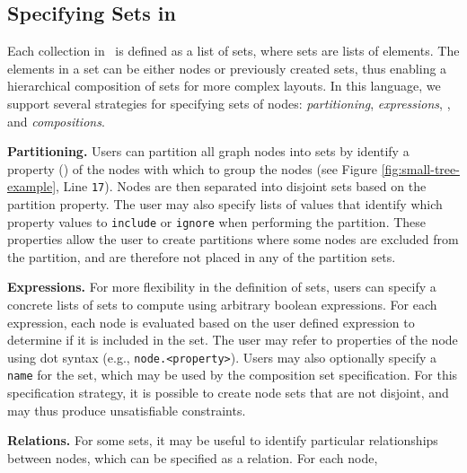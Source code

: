 
\subsection{Specifying Sets in \projectname}
Each collection in \projectname\ is defined as a list of sets, where sets
are lists of elements. The elements in a set can be either nodes or
previously created sets, thus enabling a hierarchical composition of sets
for more complex layouts. In this language, we support several strategies
for specifying sets of nodes: \emph{partitioning}, \emph{expressions},
, and \emph{compositions}.

\textbf{Partitioning.} Users can partition all graph nodes into sets by
identify a property () of the nodes
with which to group the nodes (see Figure \ref{fig:small-tree-example},
Line \texttt{17}). Nodes are then separated into disjoint sets based on the
partition property. The user may also specify lists of values that identify
which property values to \texttt{include} or \texttt{ignore} when
performing the partition. These properties allow the user to create
partitions where some nodes are excluded from the partition, and are
therefore not placed in any of the partition sets.

\textbf{Expressions.} For more flexibility in the definition of sets, users
can specify a concrete lists of sets to compute using arbitrary boolean
expressions. For each expression, each node is evaluated based on the user
defined expression to determine if it is included in the set. The user may
refer to properties of the node using dot syntax (e.g.,
\texttt{node.<property>}). Users may also optionally specify a
\texttt{name} for the set, which may be used by the composition set
specification. For this specification strategy, it is possible to create
node sets that are not disjoint, and may thus produce unsatisfiable
constraints. 

\textbf{Relations.} For some sets, it may be useful to identify particular
relationships between nodes, which can be specified as a relation. For each
node, 

\contradictionExample

